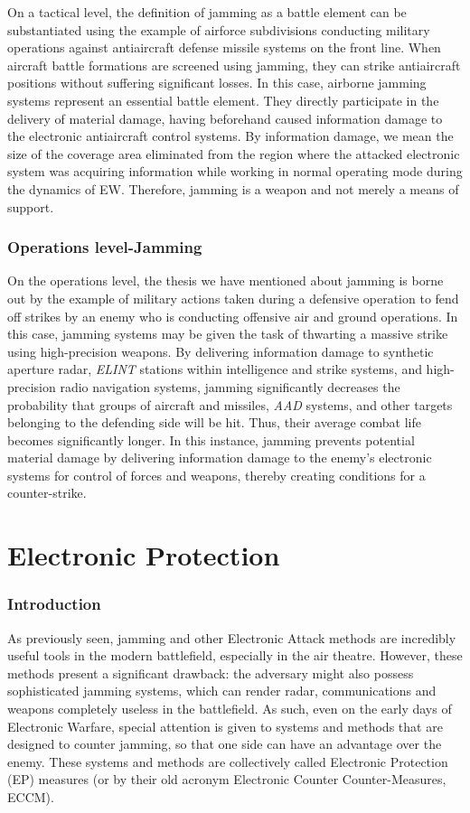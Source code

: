 \documentclass[english,purist]{ist-report}
\begin{document}
On a tactical level, the definition of jamming as a battle element can be substantiated using the example of airforce subdivisions conducting military operations against antiaircraft defense missile systems on the front line. When aircraft battle formations are screened using jamming, they can strike antiaircraft positions without suffering significant losses. In this case, airborne jamming systems represent an essential battle element. They directly participate in the delivery of material damage, having beforehand caused information damage to the electronic antiaircraft control systems.
By information damage, we mean the size of the coverage area eliminated from the region where the attacked electronic system was acquiring information while working in normal operating mode during the dynamics of EW. Therefore, jamming is a weapon and not merely a
means of support. 

\section{Operations level-Jamming}
On the operations level, the thesis we have mentioned about jamming
is borne out by the example of military actions taken during a defensive operation to fend off strikes by an enemy who is conducting offensive air and ground operations. In this case, jamming systems may be given the task of thwarting a massive strike using high-precision weapons. By delivering information damage to synthetic aperture radar, \textit{ELINT} stations within intelligence and strike systems, and high-precision radio navigation systems, jamming significantly decreases the probability that groups of aircraft and
missiles, \textit{AAD} systems, and other targets belonging to the defending side will be hit. Thus, their average combat life becomes significantly longer. In this instance, jamming prevents potential material damage by delivering information damage to the enemy's electronic systems for control of forces and weapons, thereby creating conditions for a counter-strike. 

\pagebreak
\part{Electronic Protection}
\section{Introduction}

As previously seen, jamming and other Electronic Attack methods are incredibly useful tools in the modern battlefield, especially in the air theatre. However, these methods present a significant drawback: the adversary might also possess sophisticated jamming systems, which can render radar, communications and weapons completely useless in the battlefield. As such, even on the early days of Electronic Warfare, special attention is given to systems and methods that are designed to counter jamming, so that one side can have an advantage over the enemy. These systems and methods are collectively called Electronic Protection (EP) measures (or by their old acronym Electronic Counter Counter-Measures, ECCM). 
\end{document}

